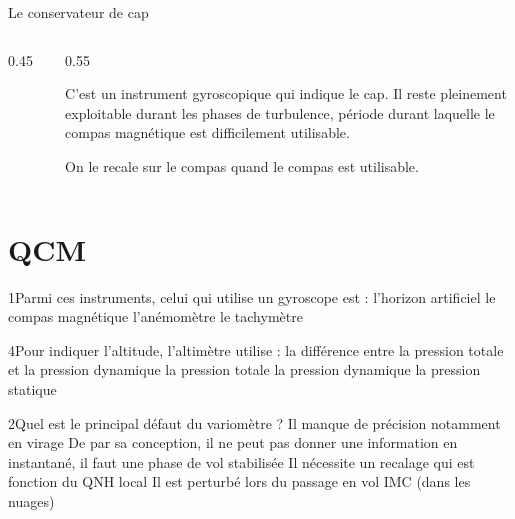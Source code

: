 	
	\begin{frame}{Le conservateur de cap}
 		\begin{columns}
 		\begin{column}{0.45\textwidth}
		\begin{figure}[H]	
		\centering
		\begin{animateinline}[controls]{30}
	\end{animateinline}
		\end{figure}
		\end{column}
 		\begin{column}{0.55\textwidth}
 		
 		C'est un instrument gyroscopique qui indique le cap. Il reste pleinement exploitable durant les phases de turbulence, période durant laquelle le compas magnétique est difficilement utilisable.
 		
 		On le recale sur le compas quand le compas est utilisable.
 			
 		\end{column}
 		\end{columns}
	\end{frame}
	
 
\appendix 
\section{QCM}
{1}{Parmi ces instruments, celui qui utilise un gyroscope est :}
{l'horizon artificiel}
{le compas magnétique}
{l'anémomètre}
{le tachymètre} 
{}

{4}{Pour indiquer l'altitude, l'altimètre utilise : }
{la différence entre la pression totale et la pression dynamique}
{la pression totale}
{la pression dynamique}
{la pression statique} 
{}

{2}{Quel est le principal défaut du variomètre ?}
{Il manque de précision notamment en virage}
{De par sa conception, il ne peut pas donner une information en instantané, il faut une phase de vol stabilisée}
{Il nécessite un recalage qui est fonction du QNH local}
{Il est perturbé lors du passage en vol IMC (dans les nuages)} 
{}

